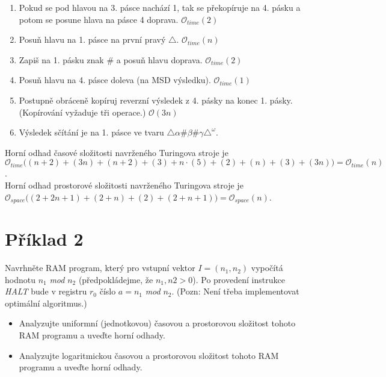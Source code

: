 \documentclass[a4paper, 11pt, fleqn]{scrartcl}
\begin{document}
\begin{enumerate}
     \item Pokud se pod hlavou na 3. pásce nachází 1, tak se překopíruje na 4. pásku a potom se posune hlava na pásce 4 doprava. $\mathcal{O}_{time}(2)$
     \item Posuň hlavu na 1. pásce na první pravý $\triangle$. $\mathcal{O}_{time}(n)$
     \item Zapiš na 1. pásku znak $\#$ a posuň hlavu doprava. $\mathcal{O}_{time}(2)$
     \item Posuň hlavu na 4. pásce doleva (na MSD výsledku). $\mathcal{O}_{time}(1)$
     \item Postupně obráceně kopíruj reverzní výsledek z 4. pásky na konec 1. pásky. (Kopírování vyžaduje tři operace.) $\mathcal{O}(3n)$
     \item Výsledek sčítání je na 1. pásce ve tvaru $\triangle\alpha\#\beta\#\gamma\triangle^\omega$.\\
   \end{enumerate}

   Horní odhad časové složitosti navrženého Turingova stroje je $\mathcal{O}_{time}\big((n+2)+(3n)+(n+2)+(3)+n\cdot(5)+(2)+(n)+(3)+(3n)\big) = \mathcal{O}_{time}(n)$.\\

   Horní odhad prostorové složitosti navrženého Turingova stroje je $\mathcal{O}_{space}\big((2+2n+1)+(2+n)+(2)+(2+n+1)\big) = \mathcal{O}_{space}(n)$.\\


  \section*{Příklad 2}
    Navrhněte RAM program, který pro vstupní vektor $I = (n_1 , n_2)$ vypočítá hodnotu $n_1$ \textit{mod} $n_2$ (předpokládejme, že $n_1 , n 2 > 0$). Po provedení instrukce \textit{HALT} bude v registru $r_0$ číslo $a = n_1$ \textit{mod} $n_2$. (Pozn: Není třeba implementovat optimální algoritmus.)
    \begin{itemize}\setlength\itemsep{-0.1em}
      \item Analyzujte uniformní (jednotkovou) časovou a prostorovou složitost tohoto RAM programu a uveďte horní odhady.
      \item Analyzujte logaritmickou časovou a prostorovou složitost tohoto RAM programu a uveďte horní odhady.
    \end{itemize}
\end{document}
